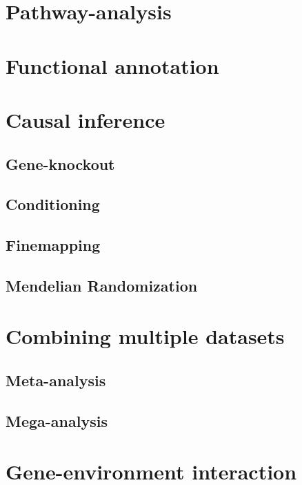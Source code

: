 \documentclass[]{book}
\theoremstyle{definition}
\theoremstyle{definition}
\theoremstyle{definition}
\theoremstyle{remark}
\begin{document}
\chapter{Pathway-analysis}\label{pathway-analysis}

\chapter{Functional annotation}\label{functional-annotation}

\chapter{Causal inference}\label{causal-inference}

\section{Gene-knockout}\label{gene-knockout}

\section{Conditioning}\label{conditioning}

\section{Finemapping}\label{finemapping}

\section{Mendelian Randomization}\label{mendelian-randomization}

\chapter{Combining multiple datasets}\label{combining-multiple-datasets}

\section{Meta-analysis}\label{meta-analysis}

\section{Mega-analysis}\label{mega-analysis}

\chapter{Gene-environment
interaction}\label{gene-environment-interaction}
\end{document}
